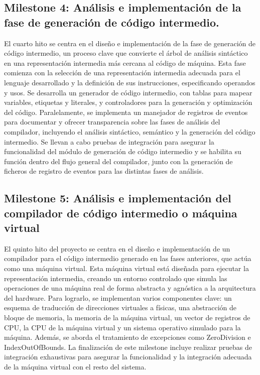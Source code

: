 \subsection{Milestone 4: Análisis e implementación de la fase de generación de código intermedio.}\label{subsection:PMV4}
El cuarto hito se centra en el diseño e implementación de la fase de generación de código intermedio, un proceso clave que convierte el árbol de análisis sintáctico en una representación intermedia más cercana al código de máquina. Esta fase comienza con la selección de una representación intermedia adecuada para el lenguaje desarrollado y la definición de sus instrucciones, especificando operandos y usos. Se desarrolla un generador de código intermedio, con tablas para mapear variables, etiquetas y literales, y controladores para la generación y optimización del código. Paralelamente, se implementa un manejador de registros de eventos para documentar y ofrecer transparencia sobre las fases de análisis del compilador, incluyendo el análisis sintáctico, semántico y la generación del código intermedio. Se llevan a cabo pruebas de integración para asegurar la funcionalidad del módulo de generación de código intermedio y se habilita su función dentro del flujo general del compilador, junto con la generación de ficheros de registro de eventos para las distintas fases de análisis.


\subsection{Milestone 5: Análisis e implementación del compilador de código intermedio o máquina virtual}\label{subsection:PMV5}
El quinto hito del proyecto se centra en el diseño e implementación de un compilador para el código intermedio generado en las fases anteriores, que actúa como una máquina virtual. Esta máquina virtual está diseñada para ejecutar la representación intermedia, creando un entorno controlado que simula las operaciones de una máquina real de forma abstracta y agnóstica a la arquitectura del hardware. Para lograrlo, se implementan varios componentes clave: un esquema de traducción de direcciones virtuales a físicas, una abstracción de bloque de memoria, la memoria de la máquina virtual, un vector de registros de CPU, la CPU de la máquina virtual y un sistema operativo simulado para la máquina. Además, se aborda el tratamiento de excepciones como ZeroDivision e IndexOutOfBounds. La finalización de este milestone incluye realizar pruebas de integración exhaustivas para asegurar la funcionalidad y la integración adecuada de la máquina virtual con el resto del sistema.

